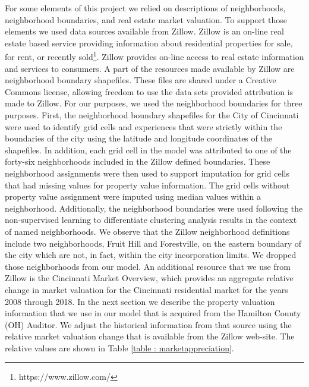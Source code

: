 \documentclass{llncs}
\begin{document}
For some elements of this project we relied on descriptions of neighborhoods, neighborhood boundaries, and real estate market valuation. To support those elements we used data sources available from Zillow. Zillow is an on-line real estate based service providing information about residential properties for sale, for rent, or recently sold\footnote{https://www.zillow.com/}. Zillow provides on-line access to real estate information and services to consumers. A part of the resources made available by Zillow are neighborhood boundary shapefiles. These files are shared under a Creative Commons license, allowing freedom to use the data sets provided attribution is made to Zillow. For our purposes, we used the neighborhood boundaries for three purposes. First, the neighborhood boundary shapefiles for the City of Cincinnati were used to identify grid cells and experiences that were strictly within the boundaries of the city using the latitude and longitude coordinates of the shapefiles. In addition, each grid cell in the model was attributed to one of the forty-six neighborhoods included in the Zillow defined boundaries. These neighborhood assignments were then used to support imputation for grid cells that had missing values for property value information. The grid cells without property value assignment were imputed using median values within a neighborhood. Additionally, the neighborhood boundaries were used following the non-supervised learning to differentiate clustering analysis results in the context of named neighborhoods. We observe that the Zillow neighborhood definitions include two neighborhoods, Fruit Hill and Forestville, on the eastern boundary of the city which are not, in fact, within the city incorporation limits. We dropped those neighborhoods from our model. An additional resource that we use from Zillow is the Cincinnati Market Overview, which provides an aggregate relative change in market valuation for the Cincinnati residential market for the years 2008 through 2018.  In the next section we describe the property valuation information that we use in our model that is acquired from the Hamilton County (OH) Auditor. We adjust the historical information from that source using the relative market valuation change that is available from the Zillow web-site. The relative values are shown in Table \ref{table : marketappreciation}.
\end{document}
